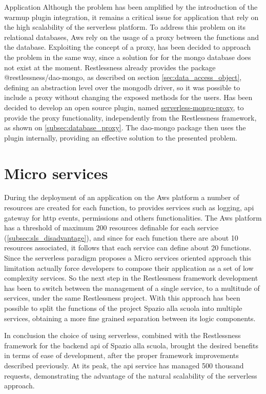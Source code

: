 \begin{chapter}{Application}
    Although the problem has been amplified by the introduction of the warmup plugin
    integration, it remains a critical issue for application that rely on the high
    scalability of the serverless platform.
    To address this problem on its relational databases, Aws rely on the usage of a
    proxy between the functions and the database. Exploiting the concept of a proxy,
    has been decided to approach the problem in the same way, since a solution for
    for the mongo database does not exist at the moment.
    Restlessness already provides the package @restlessness/dao-mongo, as described on
    section \ref{sec:data_access_object}, defining an abstraction level over the
    mongodb driver, so it was possible to include a proxy without changing the
    exposed methods for the users.
    Has been decided to develop an open source plugin, named
    \href{https://github.com/getapper/serverless-mongo-proxy}{serverless-mongo-proxy},
    to provide the proxy functionality, independently from the Restlessness framework,
    as shown on \ref{subsec:database_proxy}.
    The dao-mongo package then uses the plugin internally, providing an effective
    solution to the presented problem.

    \section{Micro services}
    \label{subsec:application_micro_services}
    During the deployment of an application on the Aws platform a number of resources
    are created for each function, to provides services such as logging, api gateway
    for http events, permissions and others functionalities. The Aws platform has a
    threshold of maximum 200 resources definable for each service
    (\ref{subsec:sls_disadvantage}), and since for each function there are about 10
    resources associated, it follows that each service can define about 20 functions.
    Since the serverless paradigm proposes a Micro services oriented approach this
    limitation actually force developers to compose their application as a set of
    low complexity services.
    So the next step in the Restlessness framework development has been to switch
    between the management of a single service, to a multitude of services, under
    the same Restlessness project. With this approach has been possible to split
    the functions of the project Spazio alla scuola into multiple services, obtaining
    a more fine grained separation between its logic components.

    \bigbreak
    In conclusion the choice of using serverless, combined with the Restlessness
    framework for the backend api of Spazio alla scuola, brought the desired benefits
    in terms of ease of development, after the proper framework improvements described
    previously. At its peak, the api service has managed 500 thousand requests,
    demonstrating the advantage of the natural scalability of the serverless approach.

\end{chapter}
